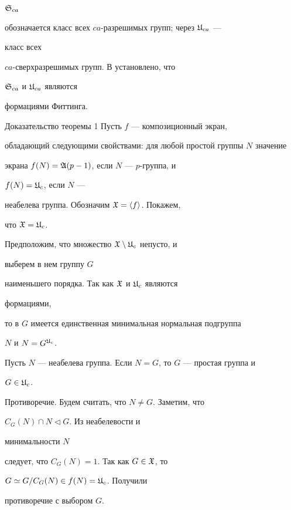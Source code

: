 $\frak S_{ca}$


обозначается класс всех $ca$-разрешимых групп; через $\frak U_{ca}$ ---


класс всех


$ca$-сверхразрешимых групп. В \cite{Ved} установлено, что


$\frak S_{ca}$ и $\frak U_{ca}$ являются


формациями Фиттинга.





\begin{pf*}{Доказательство теоремы 1} Пусть $f$ --- композиционный экран,


обладающий следующими свойствами: для любой простой группы $N$ значение


экрана $f(N)=\frak A(p-1)$, если $N$ --- $p$-группа, и


$f(N)=\frak U_c$, если $N$ ---


неабелева группа. Обозначим $\frak X=\langle f\rangle$. Покажем,


что $\frak X=\frak U_c$.


\medskip





Предположим, что множество $\frak X\setminus\frak U_c$ непусто, и


выберем в нем группу $G$


наименьшего порядка. Так как $\frak X$ и $\frak U_c$ являются


формациями,


то в $G$ имеется единственная минимальная нормальная подгруппа


$N$ и $N=G^{\frak U_c}$.


\medskip





Пусть $N$ --- неабелева группа. Если $N=G$, то $G$ --- простая группа и


$G\in\frak U_c$.


Противоречие. Будем считать, что $N\ne G$. Заметим, что


$C_G(N)\cap N\vartriangleleft G$. Из неабелевости и


минимальности $N$


следует, что $C_G(N)=1$. Так как $G\in\frak X$, то


$G\simeq G/C_G(N)\in f(N)=\frak U_c$. Получили


противоречие с выбором $G$.






\end{pf*}
